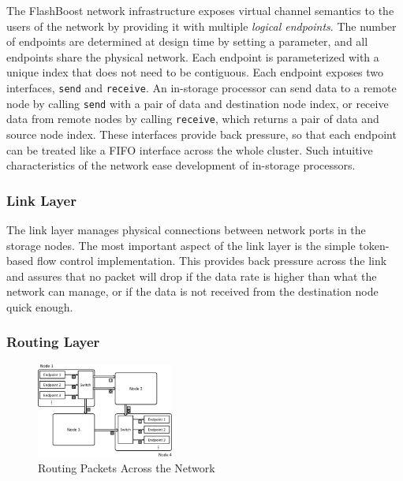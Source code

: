 The FlashBoost network infrastructure exposes virtual channel semantics to the
users of the network by providing it with multiple \emph{logical endpoints}.  The
number of endpoints are determined at design time by setting a parameter, and
all endpoints share the physical network.  Each endpoint is parameterized with a
unique index that does not need to be contiguous.  Each endpoint exposes two
interfaces, \texttt{send} and \texttt{receive}. An in-storage processor can send
data to a remote node by calling \texttt{send} with a pair of data and
destination node index, or receive data from remote nodes by calling
\texttt{receive}, which returns a pair of data and source node index. These
interfaces provide back pressure, so that each endpoint can be treated like a
FIFO interface across the whole cluster. Such intuitive characteristics of the
network ease development of in-storage processors.

\subsubsection{Link Layer}

The link layer manages physical connections between network ports in the storage
nodes. The most important aspect of the link layer is the simple token-based
flow control implementation. This provides back pressure across the link and
assures that no packet will drop if the data rate is higher than what the
network can manage, or if the data is not received from the destination node
quick enough.

\subsubsection{Routing Layer}


\begin{figure}[h]
	\begin{center}
	\includegraphics[width=0.4\textwidth]{figures/routing-crop.pdf}
	\caption{Routing Packets Across the Network}
	\label{fig:networkrouting}
	\end{center}
\end{figure}

